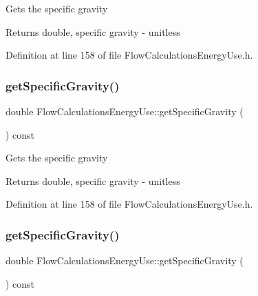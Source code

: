 Gets the specific gravity

\begin{DoxyReturn}{Returns}
double, specific gravity -\/ unitless 
\end{DoxyReturn}


Definition at line 158 of file Flow\+Calculations\+Energy\+Use.\+h.

\mbox{\label{class_flow_calculations_energy_use_adc3ac2406e00a75c33be0a6a66153da3}} 
\subsubsection{\texorpdfstring{get\+Specific\+Gravity()}{getSpecificGravity()}\hspace{0.1cm}{\footnotesize\ttfamily [2/3]}}
{\footnotesize\ttfamily double Flow\+Calculations\+Energy\+Use\+::get\+Specific\+Gravity (\begin{DoxyParamCaption}{ }\end{DoxyParamCaption}) const\hspace{0.3cm}{\ttfamily [inline]}}

Gets the specific gravity

\begin{DoxyReturn}{Returns}
double, specific gravity -\/ unitless 
\end{DoxyReturn}


Definition at line 158 of file Flow\+Calculations\+Energy\+Use.\+h.

\mbox{\label{class_flow_calculations_energy_use_adc3ac2406e00a75c33be0a6a66153da3}} 
\subsubsection{\texorpdfstring{get\+Specific\+Gravity()}{getSpecificGravity()}\hspace{0.1cm}{\footnotesize\ttfamily [3/3]}}
{\footnotesize\ttfamily double Flow\+Calculations\+Energy\+Use\+::get\+Specific\+Gravity (\begin{DoxyParamCaption}{ }\end{DoxyParamCaption}) const\hspace{0.3cm}{\ttfamily [inline]}}

